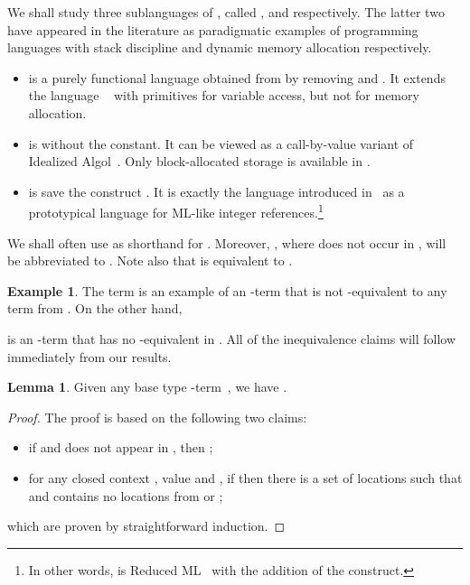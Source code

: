\documentclass{CSML}
\theoremstyle{definition}\newtheorem{definition}[thm]{Definition}
\theoremstyle{definition}\newtheorem{example}[thm]{Example}
\theoremstyle{definition}\newtheorem{proposition}[thm]{Proposition}
\theoremstyle{definition}\newtheorem{lemma}[thm]{Lemma}
\theoremstyle{definition}\newtheorem{theorem}[thm]{Theorem}
\theoremstyle{definition}\newtheorem{corollary}[thm]{Corollary}
\theoremstyle{definition}\newtheorem{remark}[thm]{Remark}
\newcommand\nt[1]{#1}
\newcommand\am[1]{#1}
\newcommand\cutout[1]{}
\begin{document}
We shall study three sublanguages of , called
,  and  respectively. The latter two
have appeared in the literature as paradigmatic examples of programming
languages with stack discipline and dynamic memory allocation respectively.
\begin{itemize}
\item 
 is a purely functional language obtained from  by removing
 and . It extends the language ~\cite{Plo77}
with primitives for variable access, but not for memory allocation.
\item 
 is  without the  constant.
It can be viewed as  a call-by-value variant of Idealized Algol~\cite{Rey81}.
Only block-allocated storage is available in .
\item 
 is  save the construct . It is exactly the language
introduced in~\cite{AM97b} as a prototypical language for ML-like integer references.\footnote{\nt{In other words,  is Reduced ML~\cite{Sta95} with the addition of the  construct.}}
\end{itemize}
{We shall often use   as shorthand for . 
Moreover, , where  does not occur in , will be abbreviated to .}
Note also that  is equivalent to .
\nt{\begin{example}
The term  is an example of an -term 
that is not \am{-equivalent} to any term from .
On the other hand, 

is an -term that has no \am{-equivalent} in . All of  the inequivalence claims will follow immediately from our results.
\end{example}}


\nt{
\begin{lemma}
Given any base type \am{-term}\, , we have  .
\end{lemma}
\begin{proof}
The proof is based on the following two claims:
\begin{itemize}
\item if  and  does not appear in , then ;
\item for any closed context , value  and , if
 then there is a set of locations  such that 
 and  contains no locations from  or ;
\end{itemize}
which are proven by straightforward induction.
\cutout{ following fact without proof: if  and  does not appear in , then .
Let us write  for , and  for .
We now show that, for any closed context , value  and , if
 then there is a set of locations  such that 
 and  contains no locations from  or . We argue by induction on . In the base case,  and the claim clearly holds as  is of base type. For the inductive case, consider  and suppose  and  and . Then, by IH, we have that  for some set of names  fresh for . By the above fact, and since  is compatible with , we have 
 and, hence by the IH, 
 for some  extending  with names fresh for . We moreover have , which yields the claim. The other inductive cases are treated similarly.

\nt{Mention the two facts in the proof, say proven by easy induction.}}
\end{proof}}
\end{document}
